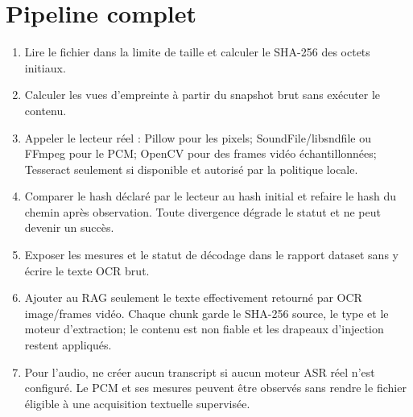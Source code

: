\documentclass[11pt,a4paper]{report}
\begin{document}
\section{Pipeline complet}
\begin{enumerate}
\item Lire le fichier dans la limite de taille et calculer le SHA-256 des octets initiaux.
\item Calculer les vues d'empreinte à partir du snapshot brut sans exécuter le contenu.
\item Appeler le lecteur réel : Pillow pour les pixels; SoundFile/libsndfile ou FFmpeg pour le PCM; OpenCV pour des frames vidéo échantillonnées; Tesseract seulement si disponible et autorisé par la politique locale.
\item Comparer le hash déclaré par le lecteur au hash initial et refaire le hash du chemin après observation. Toute divergence dégrade le statut et ne peut devenir un succès.
\item Exposer les mesures et le statut de décodage dans le rapport dataset sans y écrire le texte OCR brut.
\item Ajouter au RAG seulement le texte effectivement retourné par OCR image/frames vidéo. Chaque chunk garde le SHA-256 source, le type et le moteur d'extraction; le contenu est non fiable et les drapeaux d'injection restent appliqués.
\item Pour l'audio, ne créer aucun transcript si aucun moteur ASR réel n'est configuré. Le PCM et ses mesures peuvent être observés sans rendre le fichier éligible à une acquisition textuelle supervisée.
\end{enumerate}
\end{document}
